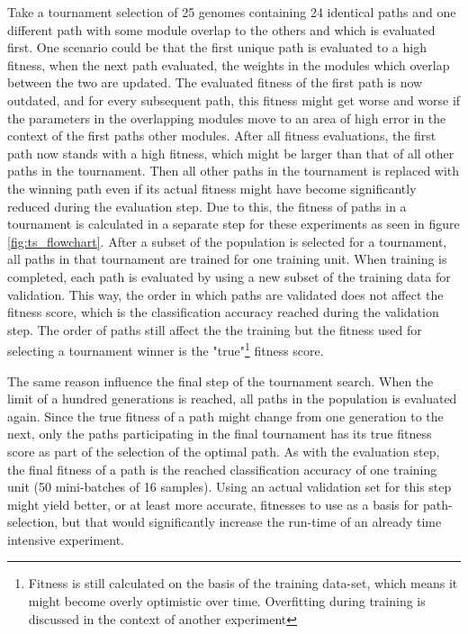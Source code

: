 Take a tournament selection of 25 genomes containing 24 identical paths and one different path with some module overlap to the others and which is evaluated first. One scenario could be that the first unique path is evaluated to a high fitness, when the next path evaluated, the weights in the modules which overlap between the two are updated. The evaluated fitness of the first path is now outdated, and for every subsequent path, this fitness might get worse and worse if the parameters in the overlapping modules move to an area of high error in the context of the first paths other modules. After all fitness evaluations, the first path now stands with a high fitness, which might be larger than that of all other paths in the tournament. Then all other paths in the tournament is replaced with the winning path even if its actual fitness might have become significantly reduced during the evaluation step. Due to this, the fitness of paths in a tournament is calculated in a separate step for these experiments as seen in figure \ref{fig:ts_flowchart}. After a subset of the population is selected for a tournament, all paths in that tournament are trained for one training unit. When training is completed, each path is evaluated by using a new subset of the training data for validation. This way, the order in which paths are validated does not affect the fitness score, which is the classification accuracy reached during the validation step. The order of paths still affect the the training but the fitness used for selecting a tournament winner is the "true"\footnote{Fitness is still calculated on the basis of the training data-set, which means it might become overly optimistic over time. Overfitting during training is discussed in the context of another experiment} fitness score.

The same reason influence the final step of the tournament search. When the limit of a hundred generations is reached, all paths in the population is evaluated again. Since the true fitness of a path might change from one generation to the next, only the paths participating in the final tournament has its true fitness score as part of the selection of the optimal path. As with the evaluation step, the final fitness of a path is the reached classification accuracy of one training unit (50 mini-batches of 16 samples). Using an actual validation set for this step might yield better, or at least more accurate, fitnesses to use as a basis for path-selection, but that would significantly increase the run-time of an already time intensive experiment. 

